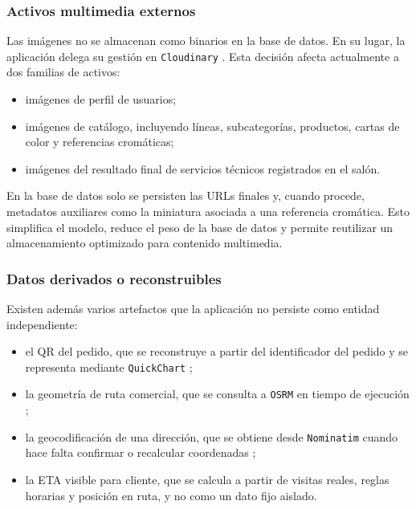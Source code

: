 \subsubsection*{Activos multimedia externos}

Las imágenes no se almacenan como binarios en la base de datos. En su lugar, la aplicación delega su gestión en \texttt{Cloudinary} \citep{cloudinaryupload2026}. Esta decisión afecta actualmente a dos familias de activos:

\begin{itemize}
    \item imágenes de perfil de usuarios;
    \item imágenes de catálogo, incluyendo líneas, subcategorías, productos, cartas de color y referencias cromáticas;
    \item imágenes del resultado final de servicios técnicos registrados en el salón.
\end{itemize}

En la base de datos solo se persisten las URLs finales y, cuando procede, metadatos auxiliares como la miniatura asociada a una referencia cromática. Esto simplifica el modelo, reduce el peso de la base de datos y permite reutilizar un almacenamiento optimizado para contenido multimedia.

\subsubsection*{Datos derivados o reconstruibles}

Existen además varios artefactos que la aplicación no persiste como entidad independiente:

\begin{itemize}
    \item el QR del pedido, que se reconstruye a partir del identificador del pedido y se representa mediante \texttt{QuickChart} \citep{quickchartqr2026};
    \item la geometría de ruta comercial, que se consulta a \texttt{OSRM} en tiempo de ejecución \citep{osrmdocs2026};
    \item la geocodificación de una dirección, que se obtiene desde \texttt{Nominatim} cuando hace falta confirmar o recalcular coordenadas \citep{nominatimapi2026};
    \item la ETA visible para cliente, que se calcula a partir de visitas reales, reglas horarias y posición en ruta, y no como un dato fijo aislado.
\end{itemize}

